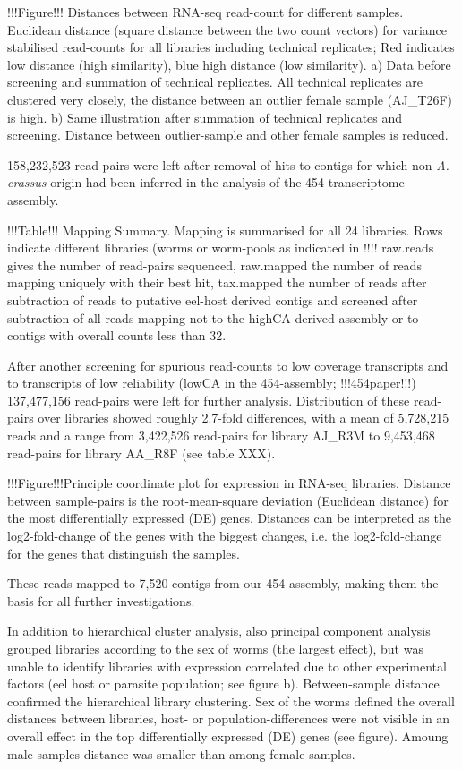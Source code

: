 \documentclass[10pt]{article}
\begin{document}
!!!Figure!!! Distances between RNA-seq read-count for different
samples. Euclidean distance (square distance between the two count
vectors) for variance stabilised read-counts for all libraries
including technical replicates; Red indicates low distance (high
similarity), blue high distance (low similarity). a) Data before
screening and summation of technical replicates. All technical
replicates are clustered very closely, the distance between an outlier
female sample (AJ\_T26F) is high. b) Same illustration after summation
of technical replicates and screening. Distance between outlier-sample
and other female samples is reduced.

158,232,523 read-pairs were left after removal of hits to contigs for
which non-\textit{A. crassus} origin had been inferred in the
analysis of the 454-transcriptome assembly.

!!!Table!!! Mapping Summary. Mapping is summarised for all 24
libraries. Rows indicate different libraries (worms or worm-pools as
indicated in !!!! raw.reads gives the number of read-pairs sequenced,
raw.mapped the number of reads mapping uniquely with their best hit,
tax.mapped the number of reads after subtraction of reads to putative
eel-host derived contigs and screened after subtraction of all reads
mapping not to the highCA-derived assembly or to contigs with overall
counts less than 32.

After another screening for spurious read-counts to low coverage
transcripts and to transcripts of low reliability (lowCA in the
454-assembly; !!!454paper!!!) 137,477,156 read-pairs were left for
further analysis. Distribution of these read-pairs over libraries
showed roughly 2.7-fold differences, with a mean of 5,728,215 reads
and a range from 3,422,526 read-pairs for library AJ\_R3M to 9,453,468
read-pairs for library AA\_R8F (see table XXX).

!!!Figure!!!Principle coordinate plot for expression in RNA-seq
libraries. Distance between sample-pairs is the root-mean-square
deviation (Euclidean distance) for the most differentially expressed
(DE) genes. Distances can be interpreted as the log2-fold-change of
the genes with the biggest changes, i.e. the log2-fold-change for the
genes that distinguish the samples.

These reads mapped to 7,520 contigs from our 454 assembly, making them
the basis for all further investigations.

In addition to hierarchical cluster analysis, also principal component
analysis grouped libraries according to the sex of worms (the largest
effect), but was unable to identify libraries with expression
correlated due to other experimental factors (eel host or parasite
population; see figure b). Between-sample distance confirmed the
hierarchical library clustering. Sex of the worms defined the overall
distances between libraries, host- or population-differences were not
visible in an overall effect in the top differentially expressed (DE)
genes (see figure). Amoung male samples distance was smaller than
among female samples.
\end{document}
